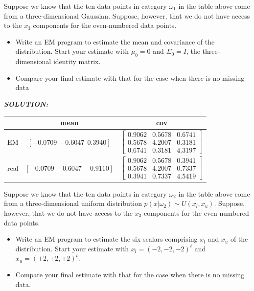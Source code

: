 \documentclass{article}
\theoremstyle{definition}
\theoremstyle{definition}
\theoremstyle{remark}
\begin{document}
Suppose we know that the ten data points in category $\omega_1$ in the table above come
from a three-dimensional Gaussian. Suppose, however, that we do not have access to
the $x_3$ components for the even-numbered data points.
\begin{itemize}
  \item Write an EM program to estimate the mean and covariance of the distribution.
Start your estimate with $\mu_0 = 0$ and $\Sigma_0 = I$, the three-dimensional identity
matrix.
  \item Compare your final estimate with that for the case when there is no missing data
\end{itemize}
\emph{\textbf{SOLUTION:}}
\begin{table}[!htp]
\centering
\begin{tabular}{|c|c|c|}
\hline
   & mean & cov \\
\hline
EM &$[-0.0709 -0.6047 ~~0.3940]$& $\begin{bmatrix} 0.9062   &  0.5678  &  0.6741\\
    0.5678  &   4.2007   &   0.3181\\
    0.6741  &     0.3181   &   4.3197\end{bmatrix}$\\
\hline
real &$[-0.0709 -0.6047 -0.9110]$& $\begin{bmatrix}0.9062   &  0.5678   &  0.3941\\
    0.5678 &    4.2007  &   0.7337\\
    0.3941  &   0.7337  &   4.5419\end{bmatrix}$\\
\hline
\end{tabular}
\end{table}

Suppose we know that the ten data points in category $\omega_2$ in the table above
come from a three-dimensional uniform distribution $p(x|\omega_2) \sim U(x_l, x_u)$. Suppose,
however, that we do not have access to the $x_3$ components for the even-numbered
data points.

\begin{itemize}
  \item Write an EM program to estimate the six scalars comprising $x_l$ and $x_u$ of the distribution.
Start your estimate with $x_l = (-2, -2, -2)^t$ and $x_u = (+2, +2, +2)^t$.
  \item Compare your final estimate with that for the case when there is no missing data.
\end{itemize}
\end{document}
